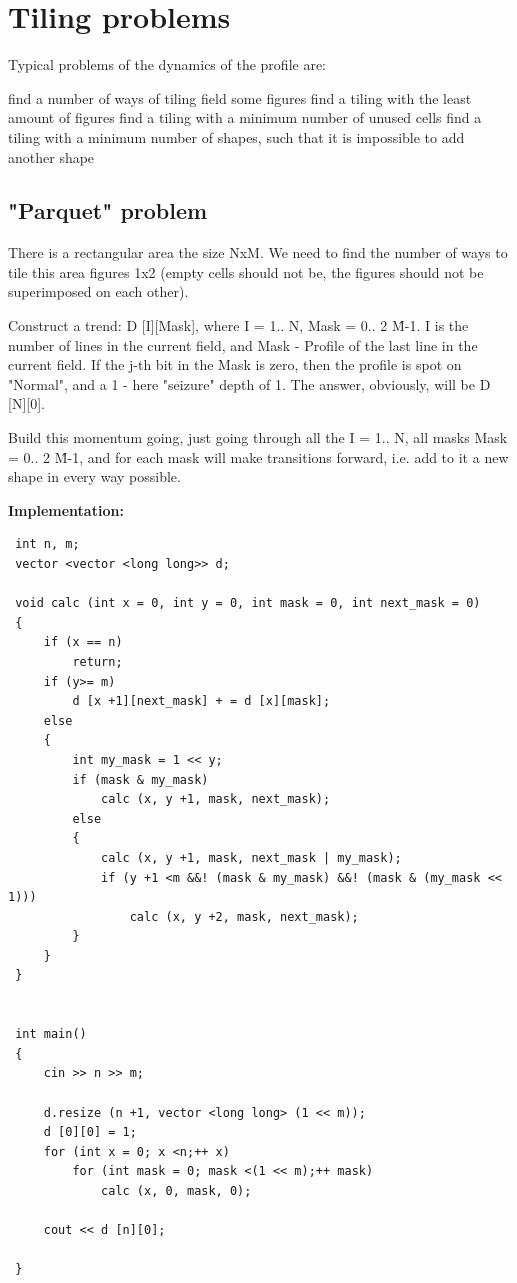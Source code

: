 \section{ Tiling problems }
Typical problems of the dynamics of the profile are:

find a number of ways of tiling field some figures
find a tiling with the least amount of figures
find a tiling with a minimum number of unused cells
find a tiling with a minimum number of shapes, such that it is impossible to add another shape
\subsection{ "Parquet" problem }
There is a rectangular area the size NxM. We need to find the number of ways to tile this area figures 1x2 (empty cells should not be, the figures should not be superimposed on each other).

Construct a trend: D [I][Mask], where I = 1.. N, Mask = 0.. 2 \^ M-1. I is the number of lines in the current field, and Mask - Profile of the last line in the current field. If the j-th bit in the Mask is zero, then the profile is spot on "Normal", and a 1 - here "seizure" depth of 1. The answer, obviously, will be D [N][0].

Build this momentum going, just going through all the I = 1.. N, all masks Mask = 0.. 2 \^ M-1, and for each mask will make transitions forward, i.e. add to it a new shape in every way possible.

\textbf{Implementation:}

\begin{verbatim}
 int n, m;
 vector <vector <long long>> d;

 void calc (int x = 0, int y = 0, int mask = 0, int next_mask = 0)
 {
     if (x == n)
         return;
     if (y>= m)
         d [x +1][next_mask] + = d [x][mask];
     else
     {
         int my_mask = 1 << y;
         if (mask & my_mask)
             calc (x, y +1, mask, next_mask);
         else
         {
             calc (x, y +1, mask, next_mask | my_mask);
             if (y +1 <m &&! (mask & my_mask) &&! (mask & (my_mask << 1)))
                 calc (x, y +2, mask, next_mask);
         }
     }
 }


 int main()
 {
     cin >> n >> m;
    
     d.resize (n +1, vector <long long> (1 << m));
     d [0][0] = 1;
     for (int x = 0; x <n;++ x)
         for (int mask = 0; mask <(1 << m);++ mask)
             calc (x, 0, mask, 0);

     cout << d [n][0];

 } 
\end{verbatim}


